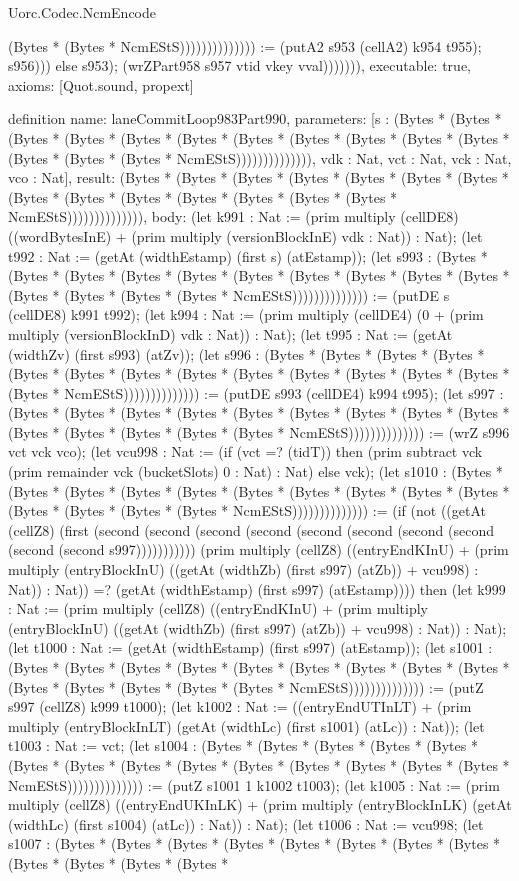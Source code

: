 \begin{lexlean}{Uorc.Codec.NcmEncode}
\begin{semanticmodule}
{(Bytes * (Bytes * NcmEStS)))))))))))))) := (putA2 s953 (cellA2) k954 t955); s956))) else s953); (wrZPart958 s957 vtid vkey vval))))))),
  executable: true,
  axioms: [Quot.sound, propext]
}

definition{
  name: laneCommitLoop983Part990,
  parameters: [s : (Bytes * (Bytes * (Bytes * (Bytes * (Bytes * (Bytes * (Bytes * (Bytes * (Bytes * (Bytes * (Bytes * (Bytes * (Bytes * (Bytes * NcmEStS)))))))))))))), vdk : Nat, vct : Nat, vck : Nat, vco : Nat],
  result: (Bytes * (Bytes * (Bytes * (Bytes * (Bytes * (Bytes * (Bytes * (Bytes * (Bytes * (Bytes * (Bytes * (Bytes * (Bytes * (Bytes * NcmEStS)))))))))))))),
  body: (let k991 : Nat := (prim multiply (cellDE8) ((wordBytesInE) + (prim multiply (versionBlockInE) vdk : Nat)) : Nat); (let t992 : Nat := (getAt (widthEstamp) (first s) (atEstamp)); (let s993 : (Bytes * (Bytes * (Bytes * (Bytes * (Bytes * (Bytes * (Bytes * (Bytes * (Bytes * (Bytes * (Bytes * (Bytes * (Bytes * (Bytes * NcmEStS)))))))))))))) := (putDE s (cellDE8) k991 t992); (let k994 : Nat := (prim multiply (cellDE4) (0 + (prim multiply (versionBlockInD) vdk : Nat)) : Nat); (let t995 : Nat := (getAt (widthZv) (first s993) (atZv)); (let s996 : (Bytes * (Bytes * (Bytes * (Bytes * (Bytes * (Bytes * (Bytes * (Bytes * (Bytes * (Bytes * (Bytes * (Bytes * (Bytes * (Bytes * NcmEStS)))))))))))))) := (putDE s993 (cellDE4) k994 t995); (let s997 : (Bytes * (Bytes * (Bytes * (Bytes * (Bytes * (Bytes * (Bytes * (Bytes * (Bytes * (Bytes * (Bytes * (Bytes * (Bytes * (Bytes * NcmEStS)))))))))))))) := (wrZ s996 vct vck vco); (let vcu998 : Nat := (if (vct =? (tidT)) then (prim subtract vck (prim remainder vck (bucketSlots) 0 : Nat) : Nat) else vck); (let s1010 : (Bytes * (Bytes * (Bytes * (Bytes * (Bytes * (Bytes * (Bytes * (Bytes * (Bytes * (Bytes * (Bytes * (Bytes * (Bytes * (Bytes * NcmEStS)))))))))))))) := (if (not ((getAt (cellZ8) (first (second (second (second (second (second (second (second (second (second (second s997))))))))))) (prim multiply (cellZ8) ((entryEndKInU) + (prim multiply (entryBlockInU) ((getAt (widthZb) (first s997) (atZb)) + vcu998) : Nat)) : Nat)) =? (getAt (widthEstamp) (first s997) (atEstamp)))) then (let k999 : Nat := (prim multiply (cellZ8) ((entryEndKInU) + (prim multiply (entryBlockInU) ((getAt (widthZb) (first s997) (atZb)) + vcu998) : Nat)) : Nat); (let t1000 : Nat := (getAt (widthEstamp) (first s997) (atEstamp)); (let s1001 : (Bytes * (Bytes * (Bytes * (Bytes * (Bytes * (Bytes * (Bytes * (Bytes * (Bytes * (Bytes * (Bytes * (Bytes * (Bytes * (Bytes * NcmEStS)))))))))))))) := (putZ s997 (cellZ8) k999 t1000); (let k1002 : Nat := ((entryEndUTInLT) + (prim multiply (entryBlockInLT) (getAt (widthLc) (first s1001) (atLc)) : Nat)); (let t1003 : Nat := vct; (let s1004 : (Bytes * (Bytes * (Bytes * (Bytes * (Bytes * (Bytes * (Bytes * (Bytes * (Bytes * (Bytes * (Bytes * (Bytes * (Bytes * (Bytes * NcmEStS)))))))))))))) := (putZ s1001 1 k1002 t1003); (let k1005 : Nat := (prim multiply (cellZ8) ((entryEndUKInLK) + (prim multiply (entryBlockInLK) (getAt (widthLc) (first s1004) (atLc)) : Nat)) : Nat); (let t1006 : Nat := vcu998; (let s1007 : (Bytes * (Bytes * (Bytes * (Bytes * (Bytes * (Bytes * (Bytes * (Bytes * (Bytes * (Bytes * (Bytes * (Bytes * }
\end{semanticmodule}
\end{lexlean}

